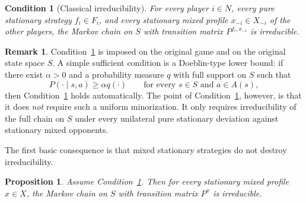 \documentclass[11pt]{article}
\newtheorem{proposition}[theorem]{Proposition}
\newtheorem{condition}[theorem]{Condition}
\theoremstyle{definition}
\newtheorem{remark}[theorem]{Remark}
\newcommand{\1}{\mathbf{1}}
\begin{document}
\begin{condition}[Classical irreducibility]\label{cond:A}
For every player $i\in N$, every pure stationary strategy $f_i\in F_i$, and every stationary mixed profile $x_{-i}\in X_{-i}$ of the other players, the Markov chain on $S$ with transition matrix $P^{f_i,x_{-i}}$ is irreducible.
\end{condition}

\begin{remark}
Condition~\ref{cond:A} is imposed on the original game and on the original state space $S$. A simple sufficient condition is a Doeblin-type lower bound: if there exist $\alpha>0$ and a probability measure $q$ with full support on $S$ such that
\[
P(\cdot\mid s,a)\ge \alpha q(\cdot)\qquad\text{for every }s\in S\text{ and }a\in A(s),
\]
then Condition~\ref{cond:A} holds automatically. The point of Condition~\ref{cond:A}, however, is that it does \emph{not} require such a uniform minorization. It only requires irreducibility of the full chain on $S$ under every unilateral pure stationary deviation against stationary mixed opponents.
\end{remark}

The first basic consequence is that mixed stationary strategies do not destroy irreducibility.

\begin{proposition}\label{prop:mixed-irreducible}
Assume Condition~\ref{cond:A}. Then for every stationary mixed profile $x\in X$, the Markov chain on $S$ with transition matrix $P^x$ is irreducible.
\end{proposition}
\end{document}
